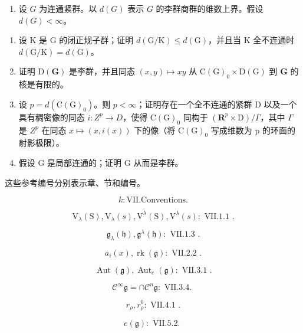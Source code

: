 
\begin{enumerate}
\def\labelenumi{\arabic{enumi})}
\tightlist
\item
  设 \(G\) 为连通紧群。以 \(d(G)\) 表示 \(G\) 的李群商群的维数上界。假设 \(d(G) < \infty\)。
\end{enumerate}

\begin{enumerate}
\def\labelenumi{\alph{enumi})}
\item
  设 K 是 G 的闭正规子群；证明 \(d(\mathrm{G}/\mathrm{K}) \leq d(\mathrm{G})\)，并且当 K 全不连通时 \(d(\mathrm{G}/\mathrm{K}) = d(\mathrm{G})\)。
\item
  证明 \(\mathrm{D}(\mathbf{G})\) 是李群，并且同态 \((x,y)\mapsto xy\) 从 \(\mathrm{C}(\mathrm{G})_0\times \mathrm{D}(\mathrm{G})\) 到 \(\mathbf{G}\) 的核是有限的。
\item
  设 \(p = d(\mathrm{C}(\mathrm{G})_{0})\)。则 \(p < \infty\)；证明存在一个全不连通的紧群 D 以及一个具有稠密像的同态 \(i : Z^{p} \to D\)，使得 \(\mathrm{C}(\mathrm{G})_{0}\) 同构于 \((\mathbf{R}^{p} \times \mathrm{D}) / \Gamma\)，其中 \(\Gamma\) 是 \(Z^{p}\) 在同态 \(x \mapsto (x, i(x))\) 下的像（将 \(\mathrm{C}(\mathrm{G})_{0}\) 写成维数为 p 的环面的射影极限）。
\item
  假设 G 是局部连通的；证明 G 从而是李群。
\end{enumerate}


这些参考编号分别表示章、节和编号。

\[
k \colon \mathrm{VII.Conventions}.
\]

\[
\mathrm{V} _ {\lambda} (\mathrm{S}), \mathrm{V} _ {\lambda} (s), \mathrm{V} ^ {\lambda} (\mathrm{S}), \mathrm{V} ^ {\lambda} (s) \colon \text { VII.1.1 }.
\]

\[
\mathfrak {g} _ {\lambda} (\mathfrak {h}), \mathfrak {g} ^ {\lambda} (\mathfrak {h}) \colon \text { VII.1.3 }.
\]

\[
a _ {i} (x), \operatorname{rk} (\mathfrak {g}): \text { VII.2.2 }.
\]

\[
\operatorname{Aut} (\mathfrak {g}), \operatorname{Aut} _ {e} (\mathfrak {g}): \text { VII.3.1 }.
\]

\[
\mathscr {C} ^ {\infty} \mathfrak {g} = \cap \mathscr {C} ^ {n} \mathfrak {g}: \text { VII.3.4. }
\]

\[
r _ {\rho}, r _ {\rho} ^ {0}: \text { VII.4.1 }.
\]

\[
e (\mathfrak {g}): \text {   VII.5.2.   }
\]

